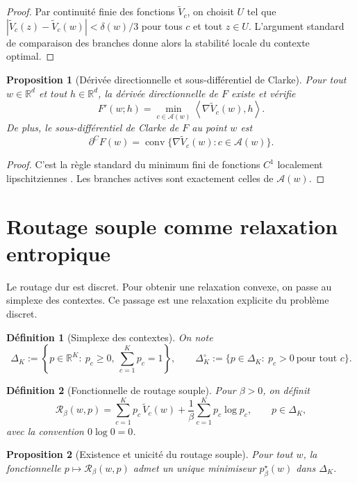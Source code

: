\documentclass[11pt,a4paper]{article}
\newtheorem{definition}{Définition}[section]
\newtheorem{proposition}{Proposition}[section]
\DeclareMathOperator{\conv}{conv}
\newcommand{\R}{\mathbb R}
\newcommand{\Rcal}{\mathcal R}
\newcommand{\Acal}{\mathcal A}
\begin{document}
\begin{proof}
Par continuité finie des fonctions \(\widetilde V_c\), on choisit \(U\) tel que \(|\widetilde V_c(z)-\widetilde V_c(w)|<\delta(w)/3\) pour tous \(c\) et tout \(z\in U\). L'argument standard de comparaison des branches donne alors la stabilité locale du contexte optimal.
\end{proof}

\begin{proposition}[Dérivée directionnelle et sous-différentiel de Clarke]
Pour tout \(w\in\R^d\) et tout \(h\in\R^d\), la dérivée directionnelle de \(F\) existe et vérifie
\[
F'(w;h)=\min_{c\in\Acal(w)}\left\langle \nabla \widetilde V_c(w),h\right\rangle.
\]
De plus, le sous-différentiel de Clarke de \(F\) au point \(w\) est
\[
\partial^C F(w)=\conv\{\nabla \widetilde V_c(w): c\in\Acal(w)\}.
\]
\end{proposition}

\begin{proof}
C'est la règle standard du minimum fini de fonctions \(C^1\) localement lipschitziennes \cite{Clarke1983}. Les branches actives sont exactement celles de \(\Acal(w)\).
\end{proof}

\section{Routage souple comme relaxation entropique}

Le routage dur est discret. Pour obtenir une relaxation convexe, on passe au simplexe des contextes. Ce passage est une relaxation explicite du problème discret.

\begin{definition}[Simplexe des contextes]
On note
\[
\Delta_K:=\left\{p\in\R^K:\ p_c\ge 0,\ \sum_{c=1}^K p_c=1\right\},
\qquad
\Delta_K^\circ:=\{p\in\Delta_K:\ p_c>0\ \text{pour tout }c\}.
\]
\end{definition}

\begin{definition}[Fonctionnelle de routage souple]
Pour \(\beta>0\), on définit
\[
\Rcal_\beta(w,p)
=
\sum_{c=1}^K p_c\,\widetilde V_c(w)
+\frac{1}{\beta}\sum_{c=1}^K p_c\log p_c,
\qquad p\in\Delta_K,
\]
avec la convention \(0\log 0=0\).
\end{definition}

\begin{proposition}[Existence et unicité du routage souple]
Pour tout \(w\), la fonctionnelle \(p\mapsto \Rcal_\beta(w,p)\) admet un unique minimiseur \(p^\star_\beta(w)\) dans \(\Delta_K\).
\end{proposition}
\end{document}

